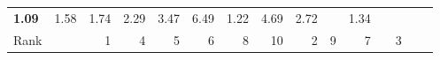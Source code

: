\begin{tabular}{ll|rrrrrr|rrrrrrr}
  


  
  \textbf{1.09} & 1.58 & 1.74 & 2.29 & 3.47 & 6.49 & 1.22 & 4.69 & 2.72 &  & 1.34 \\

  Rank & &
  1 & 4 & 5 & 6 & 8 & 10 & 2 & 9 & 7 &  & 3 \\\hline\hline
  

\end{tabular}
